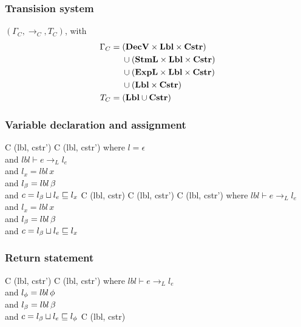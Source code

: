 \subsubsection{Transision system}
$(\Gamma_{C}, \rightarrow_{C}, T_{C})$, with
\begin{align*}
  \Gamma_{C} =  & \;        (\mathbf{DecV} \times \mathbf{Lbl} \times \mathbf{Cstr}) \\
                & \;  \cup  (\mathbf{StmL} \times \mathbf{Lbl} \times \mathbf{Cstr}) \\
                & \;  \cup  (\mathbf{ExpL} \times \mathbf{Lbl} \times \mathbf{Cstr}) \\
                & \;  \cup  (\mathbf{Lbl} \times \mathbf{Cstr})               \\
  T_{C} =       & \;  (\mathbf{Lbl} \cup \mathbf{Cstr})
\end{align*}

\subsubsection{Variable declaration and assignment}

\begin{trules}
        { {C} {(lbl, cstr')} }
        { {C} {(lbl, cstr')} }
        {where $l = \epsilon$\\
          and $lbl \vdash e \rightarrow_L l_e$\\
          and $l_x = lbl \, x$\\
          and $l_\beta = lbl \, \beta$\\
          and $c = l_\beta \sqcup l_e \sqsubseteq l_x$}
        { {C} {(lbl, cstr)}}
        {}
        { {C} {(lbl, cstr')}}
        { {C} {(lbl, cstr')}}
        {where $lbl \vdash e \rightarrow_L l_e$\\
          and $l_x = lbl \, x$\\
          and $l_\beta = lbl \, \beta$\\
          and $c = l_\beta \sqcup l_e \sqsubseteq l_x$}
\end{trules}

\subsubsection{Return statement}

\begin{trules}
        { {C} {(lbl, cstr')} }
        { {C} {(lbl, cstr')} }
        {where $lbl \vdash e \rightarrow_L l_e$\\
          and $l_\phi = lbl \, \phi$\\
          and $l_\beta = lbl \, \beta$\\
          and $c = l_\beta \sqcup l_e \sqsubseteq l_\phi$}
        { {C} {(lbl, cstr)} }
        {}
        {}
        {}
\end{trules}

